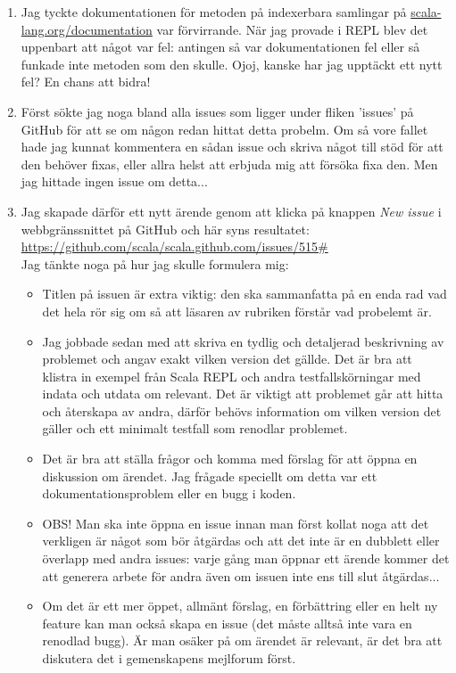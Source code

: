\begin{enumerate}

\item Jag tyckte dokumentationen för metoden  på indexerbara samlingar på \href{http://scala-lang.org/documentation/}{scala-lang.org/documentation} var förvirrande. När jag provade i REPL blev det uppenbart att något var fel: antingen så var dokumentationen fel eller så funkade inte metoden som den skulle. Ojoj, kanske har jag upptäckt ett nytt fel? En chans att bidra!

\item Först sökte jag noga bland alla issues som ligger under fliken 'issues' på GitHub för att se om någon redan hittat detta probelm. Om så vore fallet hade jag kunnat kommentera en sådan issue och skriva något till stöd för att den behöver fixas, eller allra helst att erbjuda mig att försöka fixa den. Men jag hittade ingen issue om detta...

\item Jag skapade därför ett nytt ärende genom att klicka på knappen \emph{New issue} i webbgränssnittet på GitHub och här syns resultatet: \\ \url{https://github.com/scala/scala.github.com/issues/515#} \\ Jag tänkte noga på hur jag skulle formulera mig: 

\begin{itemize}[nolistsep, noitemsep]
  \item Titlen på issuen är extra viktig: den ska sammanfatta på en enda rad vad det hela rör sig om så att läsaren av rubriken förstår vad probelemt är. 
  \item Jag jobbade sedan med att skriva en tydlig och detaljerad beskrivning av problemet och angav exakt vilken version det gällde. Det är bra att klistra in exempel från Scala REPL och andra testfallskörningar med indata och utdata om relevant. Det är viktigt att problemet går att hitta och återskapa av andra, därför behövs information om vilken version det gäller och ett minimalt testfall som renodlar problemet.
  \item Det är bra att ställa frågor och komma med förslag för att öppna en diskussion om ärendet. Jag frågade speciellt om detta var ett dokumentationsproblem eller en bugg i koden.
  \item OBS! Man ska inte öppna en issue innan man först kollat noga att det verkligen är något som bör åtgärdas och att det inte är en dubblett eller överlapp med andra issues: varje gång man öppnar ett ärende kommer det att generera arbete för andra även om issuen inte ens till slut åtgärdas... 
  \item Om det är ett mer öppet, allmänt förslag, en förbättring eller en helt ny feature kan man också skapa en issue (det måste alltså inte vara en renodlad bugg). Är man osäker på om ärendet är relevant, är det bra att diskutera det i gemenskapens mejlforum först.
\end{itemize}


\end{enumerate}
